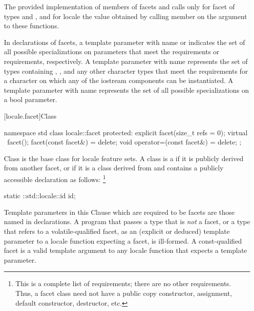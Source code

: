\pnum
The provided implementation of members of facets
and
calls
only for facet
of types
and
,
and for locale
the value obtained
by calling member
on the
argument to these functions.

\pnum
In declarations of facets, a template parameter with name
or
indicates the set of
all possible specializations on parameters that meet the
 requirements or 
requirements, respectively.
A template parameter with name
represents the set
of types containing , , and any other
character types that meet
the requirements for a character on which any of the iostream
components can be instantiated.
A template parameter with name
represents the set of all possible specializations on a bool parameter.

[locale.facet]{Class }

%
\begin{codeblock}
namespace std {
  class locale::facet {
  protected:
    explicit facet(size_t refs = 0);
    virtual ~facet();
    facet(const facet&) = delete;
    void operator=(const facet&) = delete;
  };
}
\end{codeblock}

\pnum
Class  is the base class for locale feature sets.
A class is a 
if it is publicly derived from another facet, or
if it is a class derived from  and
contains a publicly accessible declaration as follows:%
\footnote{This is a complete list of requirements; there are no other requirements.
Thus, a facet class need not have a public
copy constructor, assignment, default constructor, destructor, etc.}
\begin{codeblock}
static ::std::locale::id id;
\end{codeblock}

\pnum
Template parameters in this Clause which are required to be facets are those named
in declarations.
A program that passes a type that is
\textit{not}
a facet, or a type that refers to a volatile-qualified facet, as an
(explicit or deduced) template parameter to a locale
function expecting a facet, is ill-formed. A const-qualified facet is a
valid template argument to any locale function that expects a
 template parameter.

